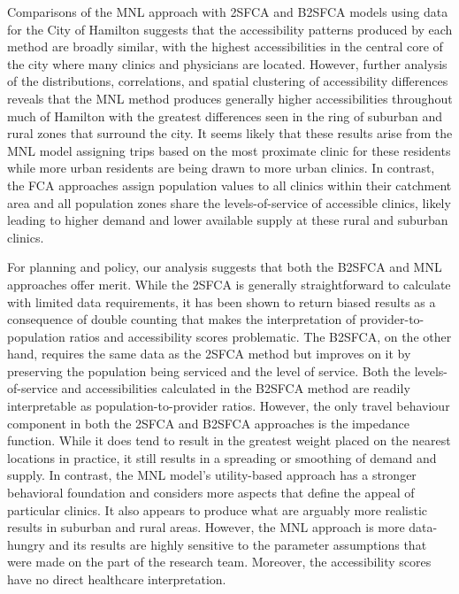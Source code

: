 \documentclass[]{elsarticle} %
\begin{document}
Comparisons of the MNL approach with 2SFCA and B2SFCA models using data
for the City of Hamilton suggests that the accessibility patterns
produced by each method are broadly similar, with the highest
accessibilities in the central core of the city where many clinics and
physicians are located. However, further analysis of the distributions,
correlations, and spatial clustering of accessibility differences
reveals that the MNL method produces generally higher accessibilities
throughout much of Hamilton with the greatest differences seen in the
ring of suburban and rural zones that surround the city. It seems likely
that these results arise from the MNL model assigning trips based on the
most proximate clinic for these residents while more urban residents are
being drawn to more urban clinics. In contrast, the FCA approaches
assign population values to all clinics within their catchment area and
all population zones share the levels-of-service of accessible clinics,
likely leading to higher demand and lower available supply at these
rural and suburban clinics.

For planning and policy, our analysis suggests that both the B2SFCA and
MNL approaches offer merit. While the 2SFCA is generally straightforward
to calculate with limited data requirements, it has been shown to return
biased results as a consequence of double counting that makes the
interpretation of provider-to-population ratios and accessibility scores
problematic. The B2SFCA, on the other hand, requires the same data as
the 2SFCA method but improves on it by preserving the population being
serviced and the level of service. Both the levels-of-service and
accessibilities calculated in the B2SFCA method are readily
interpretable as population-to-provider ratios. However, the only travel
behaviour component in both the 2SFCA and B2SFCA approaches is the
impedance function. While it does tend to result in the greatest weight
placed on the nearest locations in practice, it still results in a
spreading or smoothing of demand and supply. In contrast, the MNL
model's utility-based approach has a stronger behavioral foundation and
considers more aspects that define the appeal of particular clinics. It
also appears to produce what are arguably more realistic results in
suburban and rural areas. However, the MNL approach is more data-hungry
and its results are highly sensitive to the parameter assumptions that
were made on the part of the research team. Moreover, the accessibility
scores have no direct healthcare interpretation.
\end{document}
